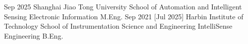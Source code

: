 \documentclass{resume}
\begin{document}
\makeheader

\begin{educations}
  \education%
    {Sep 2025}%
    {Shanghai Jiao Tong University}%
    {School of Automation and Intelligent Sensing}%
    {Electronic Information}%
    {M.Eng.}
  \separator{0.5ex}
  \education%
    {Sep 2021}%
    [Jul 2025]%
    {Harbin Institute of Technology}%
    {School of Instrumentation Science and Engineering}%
    {IntelliSense Engineering}%
    {B.Eng.}
\end{educations}

\end{document}

